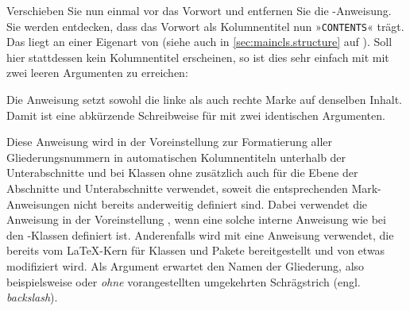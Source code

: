 \begin{Example}
      Verschieben Sie nun einmal %
       vor das Vorwort und
      entfernen Sie die -Anweisung. Sie werden entdecken, dass
      das Vorwort als Kolumnentitel nun »\texttt{CONTENTS}« trägt. Das liegt
      an einer Eigenart von %
       (siehe
      auch in \autoref{sec:maincls.structure} auf
      ). Soll hier stattdessen kein
      Kolumnentitel erscheinen, so ist dies sehr einfach mit 
      mit zwei leeren Argumenten zu erreichen:
    \end{Example}
  \fi%
  Die Anweisung
   setzt sowohl die linke als
  auch rechte Marke auf denselben Inhalt. Damit ist
   eine abkürzende Schreibweise für
   mit zwei identischen
  Argumenten.%
  \EndIndexGroup
\fi


  \begin{Declaration}
  \end{Declaration}
  Diese Anweisung wird in der Voreinstellung zur Formatierung aller
  Gliederungsnummern in automatischen Kolumnentiteln unterhalb der
  Unterabschnitte und bei Klassen ohne 
  zusätzlich auch für die Ebene der Abschnitte und Unterabschnitte verwendet,
  soweit die entsprechenden Mark-Anweisungen nicht bereits anderweitig
  definiert sind. Dabei verwendet die Anweisung in der Voreinstellung
  , wenn eine solche interne Anweisung
  wie bei den \KOMAScript-Klassen definiert ist. Anderenfalls wird mit
  eine Anweisung verwendet, die bereits vom \LaTeX-Kern für Klassen und Pakete
  bereitgestellt und von \KOMAScript{} etwas modifiziert wird. Als Argument
  erwartet  den Namen der Gliederung, also
  beispielsweise  oder  \emph{ohne}
  vorangestellten umgekehrten Schrägstrich (engl. \emph{backslash}).

